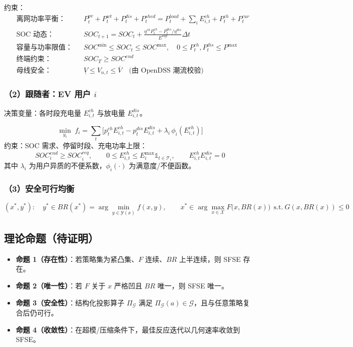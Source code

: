 \documentclass[UTF8,a4paper,11pt]{ctexart}
\begin{document}
约束：
\begin{align}
&\text{离网功率平衡：} && P_t^{pv} + P_t^{wt} + P_t^{dis} + P_t^{shed} = P_t^{load} + \sum_i E_{i,t}^{ch} + P_t^{ch} + P_t^{cur}\\
&\text{SOC 动态：} && SOC_{t+1} = SOC_t + \frac{\eta^{ch} P_t^{ch} - P_t^{dis}/\eta^{dis}}{E^{cap}}\Delta t\\
&\text{容量与功率限值：} && SOC^{\min}\le SOC_t \le SOC^{\max},\quad 0\le P_t^{ch},P_t^{dis}\le P^{\max}\\
&\text{终端约束：} && SOC_T \ge SOC^{end}\\
&\text{母线安全：} && \underline{V}\le V_{n,t}\le \overline{V}\quad \text{(由 OpenDSS 潮流校验)}
\end{align}

\subsubsection*{（2）跟随者：EV 用户 $i$}
决策变量：各时段充电量 $E_{i,t}^{ch}$ 与放电量 $E_{i,t}^{dis}$。

\begin{equation}
\min_{y_i}\; f_i = \sum_{t}\Big[ p_t^{ch} E_{i,t}^{ch} - p_t^{dis} E_{i,t}^{dis} + \lambda_i\,\phi_i(E_{i,t}^{ch}) \Big]
\end{equation}
约束：SOC 需求、停留时段、充电功率上限：
\begin{equation}
SOC_i^{end}\ge SOC_i^{req},\qquad 0\le E_{i,t}^{ch}\le E_i^{\max}\mathbb{1}_{t\in\mathcal{T}_i},\qquad E_{i,t}^{ch}E_{i,t}^{dis}=0
\end{equation}
其中 $\lambda_i$ 为用户异质的不便系数，$\phi_i(\cdot)$ 为满意度/不便函数。

\subsubsection*{（3）安全可行均衡}
\begin{equation}
(x^*,y^*):\quad y^*\in BR(x^*)=\arg\min_{y\in\mathcal{Y}(x)} f(x,y),\qquad x^*\in\arg\max_{x\in\mathcal{X}} F\big(x,BR(x)\big)\ \ \text{s.t.}\ G(x,BR(x))\le 0
\end{equation}

\subsection{理论命题（待证明）}
\begin{itemize}
  \item \textbf{命题 1（存在性）}：若策略集为紧凸集、$F$ 连续、$BR$ 上半连续，则 SFSE 存在。
  \item \textbf{命题 2（唯一性）}：若 $F$ 关于 $x$ 严格凹且 $BR$ 唯一，则 SFSE 唯一。
  \item \textbf{命题 3（安全性）}：结构化投影算子 $\Pi_{\mathcal{G}}$ 满足 $\Pi_{\mathcal{G}}(a)\in\mathcal{G}$，且与任意策略复合后仍可行。
  \item \textbf{命题 4（收敛性）}：在超模/压缩条件下，最佳反应迭代以几何速率收敛到 SFSE。
\end{itemize}
\end{document}
